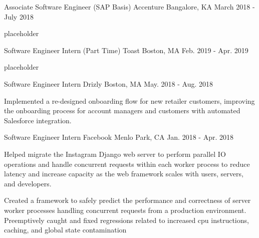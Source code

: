 
\begin{cventries}
  \cventry
    {Associate Software Engineer (SAP Basis)} %
    {Accenture} %
    {Bangalore, KA} %
    {March 2018 - July 2018} %
    {
      \begin{cvitems} %
        \item {placeholder}
      \end{cvitems}
    }
  \iffalse
  \cventry
    {Software Engineer Intern (Part Time)} %
    {Toast} %
    {Boston, MA} %
    {Feb. 2019 - Apr. 2019} %
    {
      \begin{cvitems} %
        \item {placeholder}
      \end{cvitems}
    }

  \cventry
    {Software Engineer Intern} %
    {Drizly} %
    {Boston, MA} %
    {May. 2018 - Aug. 2018} %
    {
      \begin{cvitems} %
        \item {Implemented a re-designed onboarding flow for new retailer customers, improving the onboarding process for account managers and customers with automated Salesforce integration.}
      \end{cvitems}
    }

  \cventry
    {Software Engineer Intern} %
    {Facebook} %
    {Menlo Park, CA} %
    {Jan. 2018 - Apr. 2018} %
    {
      \begin{cvitems} %
        \item {Helped migrate the Instagram Django web server to perform parallel IO operations and handle concurrent requests within each worker process to reduce latency and increase capacity as the web framework scales with users, servers, and developers.}
		\item {Created a framework to safely predict the performance and correctness of server worker processes handling concurrent requests from a production environment. Preemptively caught and fixed regressions related to increased cpu instructions, caching, and global state contamination}
      \end{cvitems}
    }


\end{cventries}
